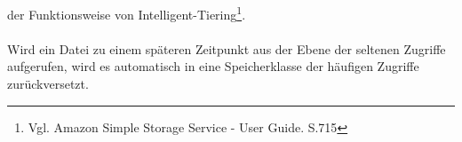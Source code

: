 der Funktionsweise von Intelligent-Tiering\footnote{Vgl. Amazon Simple Storage Service - User Guide. S.715\cite{AMZ18}}.
\\\\
Wird ein Datei zu einem späteren Zeitpunkt aus der Ebene der seltenen Zugriffe aufgerufen, wird es automatisch in eine Speicherklasse der häufigen Zugriffe zurückversetzt.

 